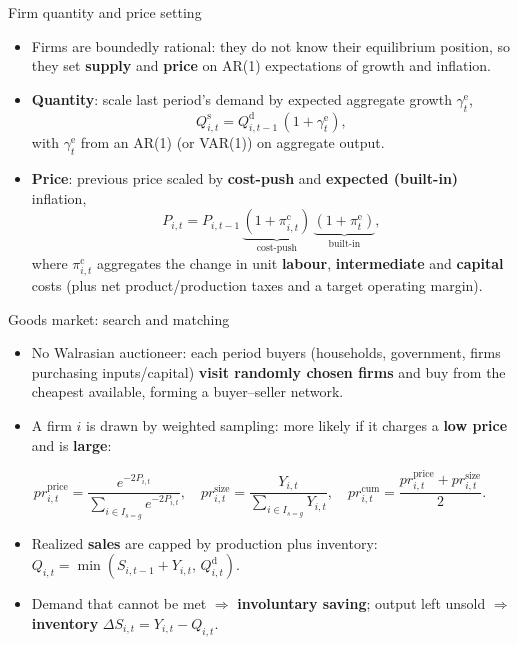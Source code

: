 \documentclass[9pt]{beamer}
\begin{document}
\begin{frame}{Firm quantity and price setting}
    \begin{itemize}
        \item Firms are boundedly rational: they do not know their equilibrium position, so they set \textbf{supply} and \textbf{price} on AR(1) expectations of growth and inflation.
        \item \textbf{Quantity}: scale last period's demand by expected aggregate growth $\gamma^{\mathrm{e}}_t$,
        \[ Q^{\mathrm{s}}_{i,t} = Q^{\mathrm{d}}_{i,t-1}\,(1+\gamma^{\mathrm{e}}_t), \]
        with $\gamma^{\mathrm{e}}_t$ from an AR(1) (or VAR(1)) on aggregate output.
        \item \textbf{Price}: previous price scaled by \textbf{cost-push} and \textbf{expected (built-in)} inflation,
        \[ P_{i,t} = P_{i,t-1}\,\underbrace{(1+\pi^{\mathrm{c}}_{i,t})}_{\text{cost-push}}\,\underbrace{(1+\pi^{\mathrm{e}}_t)}_{\text{built-in}}, \]
        where $\pi^{\mathrm{c}}_{i,t}$ aggregates the change in unit \textbf{labour}, \textbf{intermediate} and \textbf{capital} costs (plus net product/production taxes and a target operating margin).
    \end{itemize}
\end{frame}

\begin{frame}{Goods market: search and matching}
    \begin{itemize}
        \item No Walrasian auctioneer: each period buyers (households, government, firms purchasing inputs/capital) \textbf{visit randomly chosen firms} and buy from the cheapest available, forming a buyer--seller network.
        \item A firm $i$ is drawn by weighted sampling: more likely if it charges a \textbf{low price} and is \textbf{large}:
    \end{itemize}
    \vspace{-0.3em}
    \[
    pr^{\text{price}}_{i,t} = \frac{e^{-2 P_{i,t}}}{\sum_{i\in I_{s=g}} e^{-2 P_{i,t}}}, \quad
    pr^{\text{size}}_{i,t} = \frac{Y_{i,t}}{\sum_{i\in I_{s=g}} Y_{i,t}}, \quad
    pr^{\text{cum}}_{i,t} = \frac{pr^{\text{price}}_{i,t} + pr^{\text{size}}_{i,t}}{2}.
    \]
    \vspace{-0.3em}
    \begin{itemize}
        \item Realized \textbf{sales} are capped by production plus inventory:
        $Q_{i,t} = \min\!\left(S_{i,t-1} + Y_{i,t},\, Q^{\mathrm{d}}_{i,t}\right)$.
        \item Demand that cannot be met $\Rightarrow$ \textbf{involuntary saving}; output left unsold $\Rightarrow$ \textbf{inventory} $\Delta S_{i,t} = Y_{i,t} - Q_{i,t}$.
    \end{itemize}
\end{frame}
\end{document}
